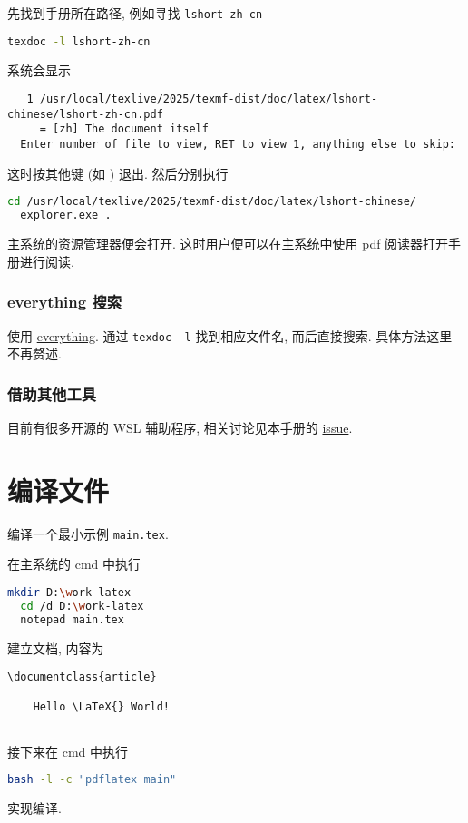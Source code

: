 先找到手册所在路径,
例如寻找 \texttt{lshort-zh-cn}
\begin{lstlisting}[language=bash]
  texdoc -l lshort-zh-cn
\end{lstlisting}
系统会显示
\begin{lstlisting}
   1 /usr/local/texlive/2025/texmf-dist/doc/latex/lshort-chinese/lshort-zh-cn.pdf
     = [zh] The document itself
  Enter number of file to view, RET to view 1, anything else to skip:
\end{lstlisting}
这时按其他键 (如 ) 退出.
然后分别执行
\begin{lstlisting}[language=bash]
  cd /usr/local/texlive/2025/texmf-dist/doc/latex/lshort-chinese/
  explorer.exe .
\end{lstlisting}
主系统的资源管理器便会打开.
这时用户便可以在主系统中使用 pdf 阅读器打开手册进行阅读.

\subsubsection{everything 搜索}

使用 \href{https://www.voidtools.com/zh-cn/}{everything}.
通过 \texttt{texdoc -l} 找到相应文件名,
而后直接搜索.
具体方法这里不再赘述.

\subsubsection{借助其他工具}

目前有很多开源的 WSL 辅助程序,
相关讨论见本手册的 \href{https://github.com/OsbertWang/install-latex-guide-zh-cn/issues/13}{issue}.

\section{编译文件}

编译一个最小示例 \texttt{main.tex}.

在主系统的 \textsf{cmd} 中执行
\begin{lstlisting}[language=bash]
  mkdir D:\work-latex
  cd /d D:\work-latex
  notepad main.tex
\end{lstlisting}
建立文档,
内容为
\begin{lstlisting}[language = {[LaTeX]TeX}]
  \documentclass{article}
  
    Hello \LaTeX{} World!
  
\end{lstlisting}
接下来在 \textsf{cmd} 中执行
\begin{lstlisting}[language=bash]
  bash -l -c "pdflatex main"
\end{lstlisting}
实现编译.

